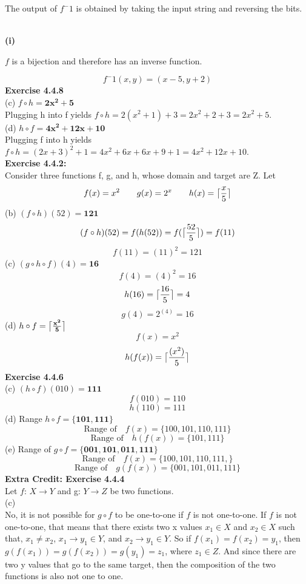 \documentclass[12pt, letterpaper, twoside]{article}
\DeclarePairedDelimiter{\ceil}{\lceil}{\rceil}
\begin{document}
\centerline{The output of $f^-1$ is obtained by taking the input string and reversing the bits.}\\
\break
\textbf{(i)}\\
\centerline{$f$ is a bijection and therefore has an inverse function.}
\[f^-1 (x, y) = (x - 5, y + 2)\]
\break
\textbf{Exercise 4.4.8}\\
(c) $f \circ h = \mathbf{2x^2 + 5}$\\
Plugging h into f yields $f \circ h = 2(x^2 + 1) + 3 = 2x^2 + 2 + 3 = 2x^2 + 5$.\\
\break
(d) $h \circ f = \mathbf{4x^2 + 12x + 10}$\\
Plugging f into h yields $f \circ h = (2x + 3)^2 + 1 = 4x^2 + 6x + 6x + 9 + 1 = 4x^2 + 12x + 10$.\\
\break
\textbf{Exercise 4.4.2:} \\
Consider three functions f, g, and h, whose domain and target are Z. Let
\[f(x) = x^2   \qquad     g(x) = 2^x   \qquad   h(x) = \ceil[\big]{\frac{x}{5}}\]
(b) $(f \circ h)(52) = \mathbf{121}$\\
\[(f \circ h)(52) = f(h(52)) = f(\ceil[\big]{\frac{52}{5}}) = f(11)\]
\[f(11) = (11)^2 = 121\]
\break
(c) $(g \circ h \circ f)(4) = \mathbf{16}$\\
\[f(4) = (4)^2 = 16\]
\[h(16) = \ceil[\big]{\frac{16}{5}} = 4\]
\[g(4) = 2^{(4)} = 16\]
\break
(d) $h \circ f = \mathbf{\ceil[\big]{\frac{x^2}{5}}}$\\
\[f(x) = x^2\]
\[h(f(x)) = \ceil[\big]{\frac{(x^2)}{5}}\]
\break
\textbf{Exercise 4.4.6}\\
(c) $(h \circ f)(010) = \mathbf{111}$\\
\[f(010) = 110\]
\[h(110) = 111\]
\break
(d) Range $h \circ f = \mathbf{\{101, 111\}}$\\
\[\text{Range of} \quad f(x) = \{100, 101, 110, 111\}\]
\[\text{Range of} \quad h(f(x)) = \{101, 111\}\]
\break
(e) Range of $g \circ f = \mathbf{\{001, 101, 011, 111\}}$\\
\[\text{Range of} \quad f(x) =  \{100, 101, 110, 111,\}\]
\[\text{Range of} \quad g(f(x)) = \{001, 101, 011, 111\}\]
\break
\newpage
\noindent\textbf{Extra Credit: Exercise 4.4.4}\\
Let $f$: $X \to Y$ and g: $Y \to Z$ be two functions.\\
\break
\noindent(c)\\
No, it is not possible for $g \circ f$ to be one-to-one if $f$ is not one-to-one. If $f$ is not one-to-one, that means that there exists two x values $x_{1} \in X$ and $x_{2} \in X$ such that, $x_{1} \neq x_{2}$, $x_{1} \to y_{1} \in Y$, and $x_{2} \to y_{1} \in Y$. So if $f(x_{1}) = f(x_{2}) = y_{1}$, then $g(f(x_{1})) = g(f(x_{2})) = g(y_{1}) = z_{1}$, where $z_{1} \in Z$. And since there are two y values that go to the same target, then the composition of the two functions is also not one to one.\\
\end{document}
